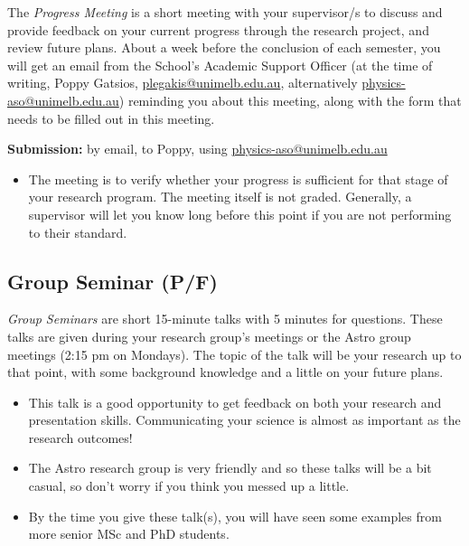 \documentclass[11pt, oneside, a4paper]{article}
\newcommand{\tipscolor}{ForestGreen}
\begin{document}
The \textit{Progress Meeting} is a short meeting with your supervisor/s to discuss and provide feedback on your current progress through the research project, and review future plans. 
About a week before the conclusion of each semester, you will get an email from the School's Academic Support Officer (at the time of writing, Poppy Gatsios, \url{plegakis@unimelb.edu.au}, alternatively \url{physics-aso@unimelb.edu.au}) reminding you about this meeting, along with the form that needs to be filled out in this meeting. 

\noindent
\textbf{Submission:} by email, to Poppy, using \url{physics-aso@unimelb.edu.au}

\begin{tcolorbox}[colback=\tipscolor!5!white,colframe=\tipscolor!50!white,title={Tips \& Tricks}]
    \begin{itemize}
        \item The meeting is to verify whether your progress is sufficient for that stage of your research program. The meeting itself is not graded. Generally, a supervisor will let you know long before this point if you are not performing to their standard. 
    \end{itemize}
\end{tcolorbox}



\subsection*{Group Seminar (P/F)}\label{GroupSeminar}

\textit{Group Seminars} are short 15-minute talks with 5 minutes for questions. These talks are given during your research group's meetings or the Astro group meetings (2:15 pm on Mondays). 
The topic of the talk will be your research up to that point, with some background knowledge and a little on your future plans. 

\begin{tcolorbox}[colback=\tipscolor!5!white,colframe=\tipscolor!50!white,title={Tips \& Tricks}]
    \begin{itemize}
        \item This talk is a good opportunity to get feedback on both your research and presentation skills. Communicating your science is almost as important as the research outcomes! 
        \item The Astro research group is very friendly and so these talks will be a bit casual, so don't worry if you think you messed up a little. 
        \item By the time you give these talk(s), you will have seen some examples from more senior MSc and PhD students. 
    \end{itemize}
\end{tcolorbox}
\end{document}
